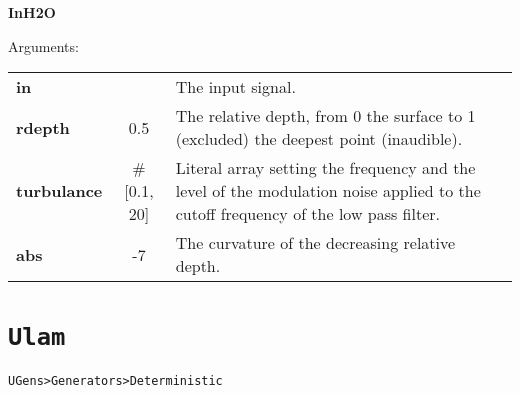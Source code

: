 \bigskip
\begin{addmargin}[1em]{0em}%
\begin{mdframed}[style=mystyle]

\bigskip

{\large \textbf{InH2O}}

\hrulefill

\color{gray!80}Arguments:\color{black} 

\bigskip

\begin{tabular}{l c p{6cm}}
\textbf{in} &  & The input signal.\\
\textbf{rdepth} & 0.5 & The relative depth, from 0 the surface to 1 (excluded) the deepest point (inaudible).\\
\textbf{turbulance} & \#[0.1, 20] &  Literal array setting the frequency and the level of the modulation noise applied to the cutoff frequency of the low pass filter.\\
\textbf{abs} & -7 & The curvature of the decreasing relative depth.
\end{tabular}

\bigskip

\end{mdframed}
\end{addmargin}


\section{\texttt{Ulam}}
\label{colz}

\texttt{UGens>Generators>Deterministic}

\bigskip

%
%
%
%
%
%
%

